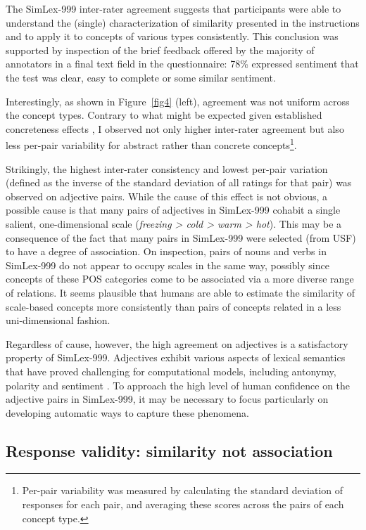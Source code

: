 The SimLex-999 inter-rater agreement suggests that participants were able to understand the (single) characterization of similarity presented in the instructions and to apply it to concepts of various types consistently. This conclusion was supported by inspection of the brief feedback offered by the majority of annotators in a final text field in the questionnaire: 78\% expressed sentiment that the test was clear, easy to complete or some similar sentiment.

Interestingly, as shown in Figure~\ref{fig4} (left), agreement was not uniform across the concept types. Contrary to what might be expected given established concreteness effects \citep{paivio1991dual}, I observed not only higher inter-rater agreement but also less per-pair variability for abstract rather than concrete concepts\footnote{Per-pair variability was measured by calculating the standard deviation of responses for each pair, and averaging these scores across the pairs of each concept type.}. 

Strikingly, the highest inter-rater consistency and lowest per-pair variation (defined as the inverse of the standard deviation of all ratings for that pair) was observed on adjective pairs. While the cause of this effect is not obvious, a possible cause is that many pairs of adjectives in SimLex-999 cohabit a single salient, one-dimensional scale (\emph{freezing > cold > warm > hot}). This may be a consequence of the fact that many pairs in SimLex-999 were selected (from USF) to have a degree of association. On inspection, pairs of nouns and verbs in SimLex-999 do not appear to occupy scales in the same way, possibly since concepts of these POS categories come to be associated via a more diverse range of relations. It seems plausible that humans are able to estimate the similarity of scale-based concepts more consistently than pairs of concepts related in a less uni-dimensional fashion. 

Regardless of cause, however, the high agreement on adjectives is a satisfactory property of SimLex-999. Adjectives exhibit various aspects of lexical semantics that have proved challenging for computational models, including antonymy, polarity \citep{williams2009predicting} and sentiment \citep{wiebe2000learning}. To approach the high level of human confidence on the adjective pairs in SimLex-999, it may be necessary to focus particularly on developing automatic ways to capture these phenomena. 

\subsection{Response validity: similarity not association}	




